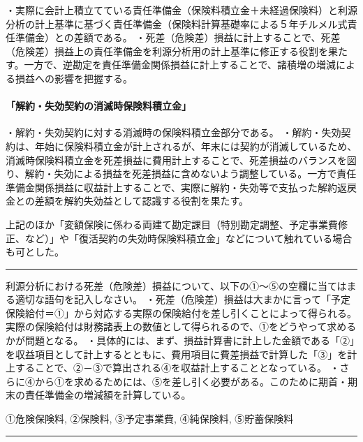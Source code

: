 \documentclass[report,gutter=10mm,fore-edge=10mm,uplatex,dvipdfmx]{jlreq}
\begin{document}
・実際に会計上積立てている責任準備金（保険料積立金＋未経過保険料）と利源分析の計上基準に基づく責任準備金（保険料計算基礎率による５年チルメル式責任準備金）との差額である。
・死差（危険差）損益に計上することで、死差（危険差）損益上の責任準備金を利源分析用の計上基準に修正する役割を果たす。一方で、逆勘定を責任準備金関係損益に計上することで、諸積増の増減による損益への影響を把握する。

\paragraph{「解約・失効契約の消滅時保険料積立金」}

・解約・失効契約に対する消滅時の保険料積立金部分である。
・解約・失効契約は、年始に保険料積立金が計上されるが、年末には契約が消滅しているため、消滅時保険料積立金を死差損益に費用計上することで、死差損益のバランスを図り、解約・失効による損益を死差損益に含めないよう調整している。一方で責任準備金関係損益に収益計上することで、実際に解約・失効等で支払った解約返戻金との差額を解約失効益として認識する役割を果たす。

上記のほか「変額保険に係わる両建て勘定課目（特別勘定調整、予定事業費修正、など）」や「復活契約の失効時保険料積立金」などについて触れている場合も可とした。

\begin{center}\rule{0.5\linewidth}{0.5pt}\end{center}


利源分析における死差（危険差）損益について、以下の①～⑤の空欄に当てはまる適切な語句を記入しなさい。
・死差（危険差）損益は大まかに言って「予定保険給付＝①」から対応する実際の保険給付を差し引くことによって得られる。実際の保険給付は財務諸表上の数値として得られるので、①をどうやって求めるかが問題となる。
・具体的には、まず、損益計算書に計上した金額である「②」を収益項目として計上するとともに、費用項目に費差損益で計算した「③」を計上することで、②－③で算出される④を収益計上することとなっている。
・さらに④から①を求めるためには、⑤を差し引く必要がある。このために期首・期末の責任準備金の増減額を計算している。


①危険保険料, ②保険料, ③予定事業費, ④純保険料, ⑤貯蓄保険料

\begin{center}\rule{0.5\linewidth}{0.5pt}\end{center}

\end{document}

